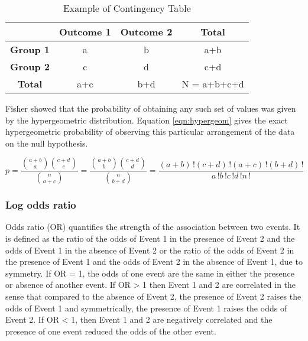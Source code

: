 \begin {table}
    \caption{Example of Contingency Table}
    \begin{center}
        \begin{tabular}{ c c c |c} 
            \hline
            &  \textbf{Outcome 1} & \textbf{Outcome 2} & \textbf{Total}\\
             \hline
             \hline
             \textbf{Group 1} & a & b & a+b \\ 
             \textbf{Group 2} & c & d & c+d \\
             \hline
             \textbf{Total} & a+c & b+d & N = a+b+c+d\\
             \hline
        \end{tabular}
    \label{table:cont}
    \end{center}
\end{table}

Fisher showed that the probability of obtaining any such set of values was given by the hypergeometric distribution. Equation \ref{eqn:hypergeom} gives the exact hypergeometric probability of observing this particular arrangement of the data on the null hypothesis. 

\begin{equation}
    \label{eqn:hypergeom}
    p = \frac{\binom{a+b}{a} \binom{c+d}{c}}{\binom{n}{a+c}} = \frac{\binom{a+b}{b} \binom{c+d}{d}}{\binom{n}{b+d}} = \frac{(a+b)\,!(c+d)\,!(a+c)\,!(b+d)\,!}{a\,!
    b\,!c\,!d\,!n\,!}
\end{equation}

\subsubsection{Log odds ratio}
Odds ratio (OR) quantifies the strength of the association between two events. It is defined as the ratio of the odds of Event 1 in the presence of Event 2 and the odds of Event 1 in the absence of Event 2 or the ratio of the odds of Event 2 in the presence of Event 1 and the odds of Event 2 in the absence of Event 1, due to symmetry. If OR = 1, the odds of one event are the same in either the presence or absence of another event. If OR > 1 then Event 1 and 2 are correlated in the sense that compared to the absence of Event 2, the presence of Event 2 raises the odds of Event 1 and symmetrically, the presence of Event 1 raises the odds of Event 2. If OR < 1, then Event 1 and 2 are negatively correlated and the presence of one event reduced the odds of the other event.

